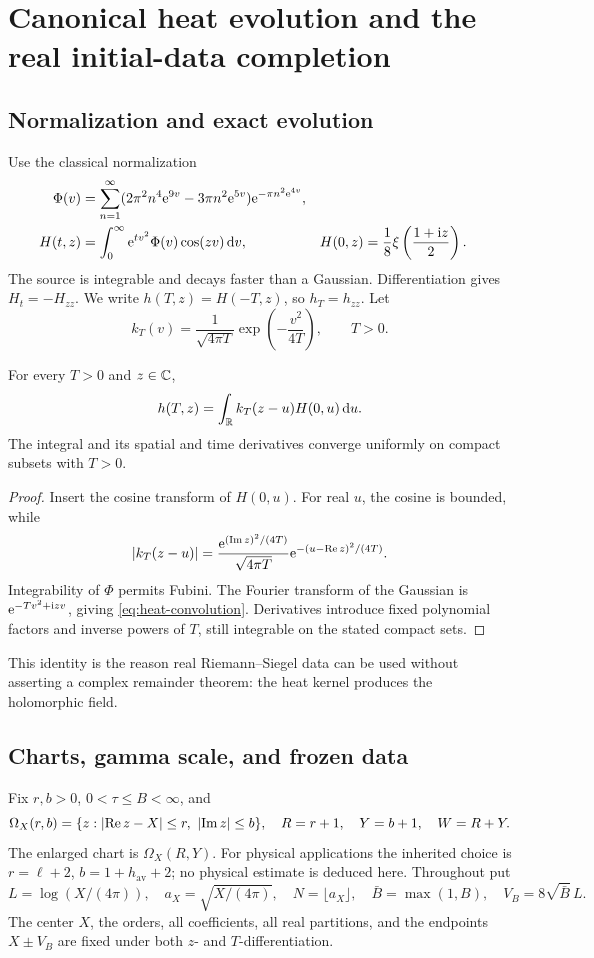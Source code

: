 \section{Canonical heat evolution and the real initial-data completion}
\label{sec:source}
\subsection{Normalization and exact evolution}
Use the classical normalization \cite{polymath}
\begin{subequations}\label{eq:canonical}
\begin{align}
 \Phi(v)&=\sum_{n=1}^{\infty}
 (2\pi^2n^4\mathrm e^{9v}-3\pi n^2\mathrm e^{5v})\mathrm e^{-\pi n^2\mathrm e^{4v}},\\
 H(t,z)&=\int_0^\infty \mathrm e^{tv^2}\Phi(v)\cos(zv)\,\mathrm d v,
 & H(0,z)&=\frac18\xi\left(\frac{1+\mathrm i z}{2}\right).
\end{align}
\end{subequations}
The source is integrable and decays faster than a Gaussian.
Differentiation gives \(H_t=-H_{zz}\).
We write \(h(T,z)=H(-T,z)\), so \(h_T=h_{zz}\).
Let
\[
 k_T(v)=\frac1{\sqrt{4\pi T}}\exp\left(-\frac{v^2}{4T}\right),
 \qquad T>0.
\]
\begin{lemma}\label{lem:heat}
For every \(T>0\) and \(z\in\mathbb C\),
\begin{equation}
 h(T,z)=\int_\mathbb R k_T(z-u)H(0,u)\,\mathrm d u.
 \label{eq:heat-convolution}
\end{equation}
The integral and its spatial and time derivatives converge uniformly
on compact subsets with \(T>0\).
\end{lemma}
\begin{proof}
Insert the cosine transform of \(H(0,u)\).
For real \(u\), the cosine is bounded, while
\[
 \lvert k_T(z-u)\rvert
 =\frac{\mathrm e^{(\operatorname{Im} z)^2/(4T)}}{\sqrt{4\pi T}}
      \mathrm e^{-(u-\operatorname{Re} z)^2/(4T)}.
\]
Integrability of \(\Phi\) permits Fubini. The Fourier transform of
the Gaussian is \(\mathrm e^{-Tv^2+\mathrm i zv}\), giving
\eqref{eq:heat-convolution}. Derivatives introduce fixed polynomial
factors and inverse powers of \(T\), still integrable on the stated
compact sets.
\end{proof}
This identity is the reason real Riemann--Siegel data can be used
without asserting a complex remainder theorem: the heat kernel
produces the holomorphic field.

\subsection{Charts, gamma scale, and frozen data}
Fix \(r,b>0\), \(0<\tau\le B<\infty\), and
\[
 \Omega_X(r,b)=\{z:\abs{\Rea z-X}\le r,\ \abs{\Ima z}\le b\},
 \quad R=r+1,\quad Y=b+1,\quad W=R+Y.
\]
The enlarged chart is \(\Omega_X(R,Y)\).
For physical applications the inherited choice is
\(r=\ell+2\), \(b=1+h_{\mathrm{av}}+2\); no physical estimate is
deduced here.
Throughout put
\[
 L=\log(X/(4\pi)),\quad a_X=\sqrt{X/(4\pi)},\quad
 N=\lfloor a_X\rfloor,\quad
 \bar B=\max(1,B),\quad V_B=8\sqrt{\bar B}\,L.
\]
The center \(X\), the orders, all coefficients, all real partitions,
and the endpoints \(X\pm V_B\) are fixed under both \(z\)- and
\(T\)-differentiation.

